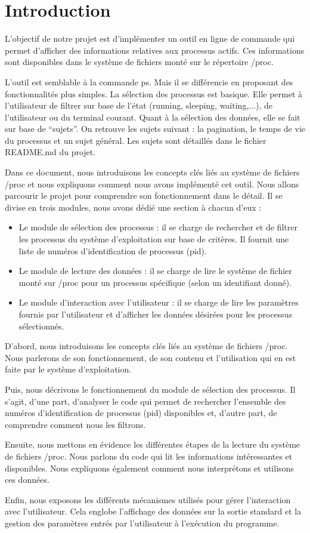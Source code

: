 \section{Introduction}
L’objectif de notre projet est d’implémenter un outil en ligne de commande qui permet d’afficher des informations relatives aux processus actifs. Ces informations sont disponibles dans le système de fichiers monté sur le répertoire /proc.

L’outil est semblable à la commande ps. Mais il se différencie en proposant des fonctionnalités plus simples.  La sélection des processus est basique. Elle permet à l’utilisateur de filtrer sur base de l’état (running, sleeping, waiting,...), de l’utilisateur ou du terminal courant. Quant à la sélection des données, elle se fait sur base de “sujets”. On retrouve les sujets suivant : la pagination, le temps de vie du processus et un sujet général. Les sujets sont détaillés dans le fichier README.md du projet.

Dans ce document, nous introduisons les concepts clés liés au système de fichiers /proc et nous expliquons comment nous avons implémenté cet outil. Nous allons parcourir le projet pour comprendre son fonctionnement dans le détail. Il se divise en trois modules, nous avons dédié une section à chacun d’eux :

\begin{itemize}
\item Le module de sélection des processus : il se charge de rechercher et de filtrer les processus du système d’exploitation sur base de critères. Il fournit une liste de numéros d’identification de processus (pid).
\item Le module de lecture des données : il se charge de lire le système de fichier monté sur /proc pour un processus spécifique (selon un identifiant donné).
\item Le module d’interaction avec l’utilisateur : il se charge de lire les paramètres fournis par l’utilisateur et d’afficher les données désirées pour les processus sélectionnés.
\end{itemize}

D’abord, nous introduisons les concepts clés liés au système de fichiers /proc. Nous parlerons de son fonctionnement, de son contenu et l'utilisation qui en est faite par le système d'exploitation.

Puis, nous décrivons le fonctionnement du module de sélection des processus. Il s’agit, d’une part, d’analyser le code qui permet de rechercher l’ensemble des numéros d’identification de processus (pid) disponibles et, d’autre part, de comprendre comment nous les filtrons.

Ensuite, nous mettons en évidence les différentes étapes de la lecture du système de fichiers /proc. Nous parlons du code qui lit les informations intéressantes et disponibles. Nous expliquons également comment nous interprétons et utilisons ces données.

Enfin, nous exposons les différents mécanismes utilisés pour gérer l’interaction avec l’utilisateur. Cela englobe l’affichage des données sur la sortie standard et la gestion des paramètres entrés par l’utilisateur à l’exécution du programme.